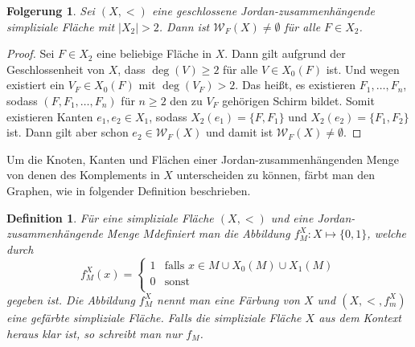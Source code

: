 \documentclass[12pt,titlepage,twoside,cleardoublepage]{article}
\theoremstyle{nummermitklammern}
\newtheorem{folgerung}[temp]{Folgerung}
\newtheorem{definition}[temp]{Definition}
\newtheorem{definition}[zahl]{Definition}
\newtheorem{folgerung}[zahl]{Folgerung}
\numberwithin{equation}{section}
\begin{document}
\begin{folgerung}
Sei $(X,<)$ eine geschlossene Jordan-zusammenhängende simpliziale Fläche mit $\vert X_2\vert > 2$. Dann ist $\mathcal{W}_F(X)\neq \emptyset$ für alle $F \in X_2$.
\end{folgerung}
\begin{proof}
Sei $F\in X_2$ eine beliebige Fläche in $X$. Dann gilt aufgrund der Geschlossenheit von $X$, dass $\deg(V) \geq 2$ für alle $V \in X_0(F)$ ist. Und wegen  existiert ein $V_F\in X_0(F)$ mit $\deg(V_F)> 2$. Das heißt, es existieren $F_1,\ldots,F_n$, sodass $(F,F_1,\ldots,F_n)$ für $n \geq 2$ den zu $V_F$ gehörigen Schirm bildet. Somit existieren Kanten $e_1,e_2 \in X_1$, sodass $X_2(e_1)=\{F,F_1\}$ und $X_2(e_2)=\{F_1,F_2\}$ ist. Dann gilt aber schon $e_2 \in \mathcal{W}_F(X)$ und damit ist $\mathcal{W}_F(X) \neq \emptyset$.
\end{proof}
Um die Knoten, Kanten und Flächen einer Jordan-zusammenhängenden Menge von denen des Komplements in $X$ unterscheiden zu können, färbt man den Graphen, wie in folgender Definition beschrieben.

\begin{definition}
Für eine simpliziale Fläche $(X,<)$ und eine Jordan-\\ zusammenhängende Menge $M$definiert man die Abbildung $f_M^X:X \mapsto\{0,1\}$, welche durch
\[
f^X_M(x)=\begin{cases}
1 & \text{falls } x\in M \cup X_0(M)\cup X_1(M)\\
0 &\text{sonst}\\

\end{cases}
\]
gegeben ist.
Die Abbildung $f_M^X$ nennt man eine \emph{Färbung} von $X$ und $(X,<,f_m^X)$ eine gefärbte simpliziale Fläche. Falls die simpliziale Fläche $X$ aus dem Kontext heraus klar ist, so schreibt man nur $f_M$.
\end{definition}
\end{document}
